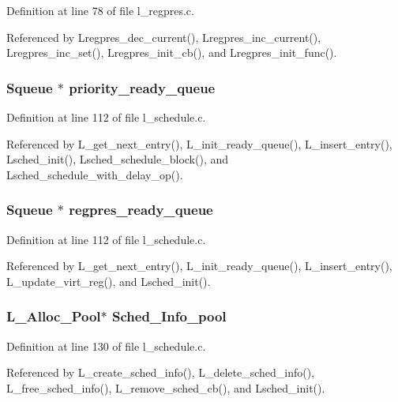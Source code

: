 Definition at line 78 of file l\_\-regpres.c.

Referenced by Lregpres\_\-dec\_\-current(), Lregpres\_\-inc\_\-current(), Lregpres\_\-inc\_\-set(), Lregpres\_\-init\_\-cb(), and Lregpres\_\-init\_\-func().
\subsubsection{\setlength{\rightskip}{0pt plus 5cm}\bf{Squeue} $\ast$ \bf{priority\_\-ready\_\-queue}}\label{l__schedule_8h_7ad0faa72489db11d3885ff9a0f42366}




Definition at line 112 of file l\_\-schedule.c.

Referenced by L\_\-get\_\-next\_\-entry(), L\_\-init\_\-ready\_\-queue(), L\_\-insert\_\-entry(), Lsched\_\-init(), Lsched\_\-schedule\_\-block(), and Lsched\_\-schedule\_\-with\_\-delay\_\-op().
\subsubsection{\setlength{\rightskip}{0pt plus 5cm}\bf{Squeue} $\ast$ \bf{regpres\_\-ready\_\-queue}}\label{l__schedule_8h_99d40e945682d462016f6899c74be8d9}




Definition at line 112 of file l\_\-schedule.c.

Referenced by L\_\-get\_\-next\_\-entry(), L\_\-init\_\-ready\_\-queue(), L\_\-insert\_\-entry(), L\_\-update\_\-virt\_\-reg(), and Lsched\_\-init().
\subsubsection{\setlength{\rightskip}{0pt plus 5cm}\bf{L\_\-Alloc\_\-Pool}$\ast$ \bf{Sched\_\-Info\_\-pool}}\label{l__schedule_8h_373147875f98887da63ee267f1ac4cfe}




Definition at line 130 of file l\_\-schedule.c.

Referenced by L\_\-create\_\-sched\_\-info(), L\_\-delete\_\-sched\_\-info(), L\_\-free\_\-sched\_\-info(), L\_\-remove\_\-sched\_\-cb(), and Lsched\_\-init().
